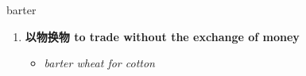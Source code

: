 
\begin{frame}
{\huge barter}
\begin{center}
\begin{enumerate}\Large
  \item \textbf{以物换物 to trade without the exchange of money}
  \begin{itemize}
    \item \em{\Large{barter wheat for cotton}}
  \end{itemize}
\end{enumerate}
\end{center}
\end{frame}
